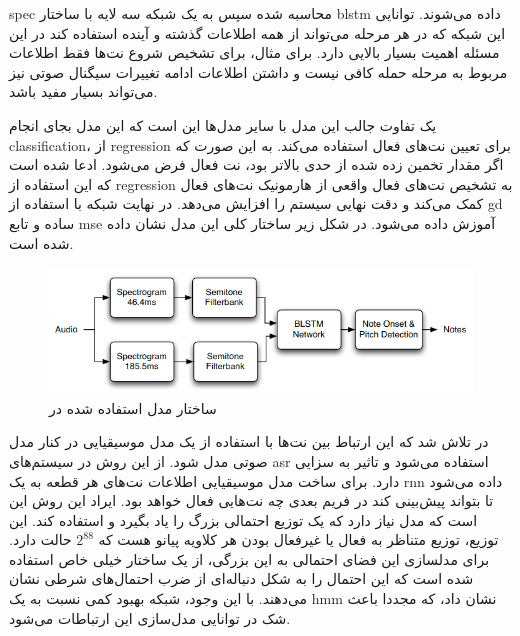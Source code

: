 \gls{spec} محاسبه شده سپس به یک شبکه سه لایه با ساختار \gls{blstm} داده می‌شوند.
توانایی این شبکه که در هر مرحله می‌تواند از همه اطلاعات گذشته و آینده استفاده
کند در این مسئله اهمیت بسیار بالایی دارد. برای مثال، برای تشخیص شروع نت‌ها فقط
اطلاعات مربوط به مرحله حمله کافی نیست و داشتن اطلاعات ادامه تغییرات سیگنال صوتی
نیز می‌تواند بسیار مفید باشد.

یک تفاوت جالب این مدل با سایر مدل‌ها این است که این مدل بجای انجام
\gls{classification}، از \gls{regression} برای تعیین نت‌های فعال استفاده می‌کند.
به این صورت که اگر مقدار تخمین زده شده از حدی بالاتر بود، نت فعال فرض می‌شود.
ادعا شده است که این استفاده از \gls{regression} به تشخیص نت‌های فعال واقعی از
هارمونیک نت‌های فعال کمک می‌کند و دقت نهایی سیستم را افزایش می‌دهد. در نهایت
شبکه با استفاده از \gls{gd} ساده و تابع \gls{mse} آموزش داده می‌شود. در شکل
زیر ساختار کلی این مدل نشان داده شده است.
\begin{figure}[ht]
    \centering
    \includegraphics[width=12cm]{./statics/bock2012polyphonic_architecture.png}
    \caption{ساختار مدل استفاده شده در \cite{bock2012polyphonic}}
\end{figure}

در \cite{sigtia2016end} تلاش شد که این ارتباط بین نت‌ها با استفاده از یک مدل
موسیقیایی در کنار مدل صوتی مدل شود. از این روش در سیستم‌های \gls{asr} استفاده
می‌شود و تاثیر به سزایی دارد. برای ساخت مدل موسیقیایی اطلاعات نت‌های هر قطعه به
یک \gls{rnn} داده می‌شود تا بتواند پیش‌بینی کند در فریم بعدی چه نت‌هایی فعال خواهد
بود. ایراد این روش این است که مدل نیاز دارد که یک توزیع احتمالی بزرگ را یاد
بگیرد و استفاده کند. این توزیع، توزیع متناظر به فعال یا غیرفعال بودن هر کلاویه
پیانو هست که $2^{88}$ حالت دارد. برای مدلسازی این فضای احتمالی به این بزرگی، از
یک ساختار خیلی خاص استفاده شده است که این احتمال را به شکل دنباله‌ای از ضرب
احتمال‌های شرطی نشان می‌دهند. با این وجود، شبکه بهبود کمی نسبت به یک \gls{hmm}
نشان داد، که مجددا باعث شک در توانایی مدل‌سازی این ارتباطات می‌شود.

